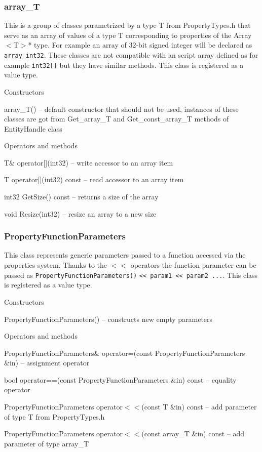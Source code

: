 \subsubsection{array\_T}

This is a group of classes parametrized by a type T from PropertyTypes.h that serve as an array of values of a type T corresponding to properties of the Array$<$T$>$* type. For example an array of 32-bit signed integer will be declared as \verb/array_int32/. These classes are not compatible with an script array defined as for example \verb/int32[]/ but they have similar methods. This class is registered as a value type.

\begin{titled-itemize}{Constructors}
  \item array\_T() -- default constructor that should not be used, instances of these classes are got from Get\_array\_T and Get\_const\_array\_T methods of EntityHandle class
\end{titled-itemize}

\begin{titled-itemize}{Operators and methods}
  \item T\& operator[](int32) -- write accessor to an array item
  \item T operator[](int32) const -- read accessor to an array item
  \item int32 GetSize() const -- returns a size of the array
  \item void Resize(int32) -- resize an array to a new size
\end{titled-itemize}

\subsubsection{PropertyFunctionParameters}

This class represents generic parameters passed to a function accessed via the properties system. Thanks to the $<<$ operators the function parameter can be passed as \verb/PropertyFunctionParameters()/ \verb/<< param1 << param2 .../. This class is registered as a value type.

\begin{titled-itemize}{Constructors}
  \item PropertyFunctionParameters() -- constructs new empty parameters
\end{titled-itemize}

\begin{titled-itemize}{Operators and methods}
  \item PropertyFunctionParameters\& operator=(const PropertyFunctionParameters \&in) -- assignment operator
  \item bool operator==(const PropertyFunctionParameters \&in) const -- e\-qua\-li\-ty operator
  \item PropertyFunctionParameters operator$<<$(const T \&in) const -- add parameter of type T from PropertyTypes.h
  \item PropertyFunctionParameters operator$<<$(const array\_T \&in) const -- add parameter of type array\_T
\end{titled-itemize}

